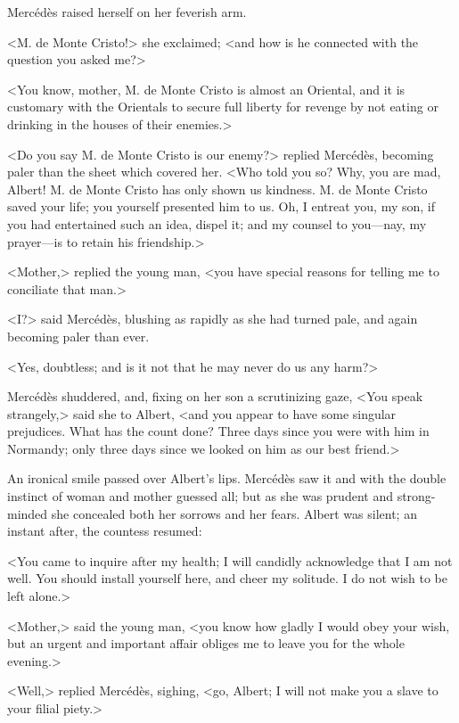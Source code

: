  Mercédès raised herself on her feverish arm. 

 <M. de Monte Cristo!> she exclaimed; <and how is he connected with the question you asked me?>

<You know, mother, M. de Monte Cristo is almost an Oriental, and it is customary with the Orientals to secure full liberty for revenge by not eating or drinking in the houses of their enemies.> 

 <Do you say M. de Monte Cristo is our enemy?> replied Mercédès, becoming paler than the sheet which covered her. <Who told you so? Why, you are mad, Albert! M. de Monte Cristo has only shown us kindness. M. de Monte Cristo saved your life; you yourself presented him to us. Oh, I entreat you, my son, if you had entertained such an idea, dispel it; and my counsel to you—nay, my prayer—is to retain his friendship.> 

 <Mother,> replied the young man, <you have special reasons for telling me to conciliate that man.> 

 <I?> said Mercédès, blushing as rapidly as she had turned pale, and again becoming paler than ever. 

 <Yes, doubtless; and is it not that he may never do us any harm?> 

 Mercédès shuddered, and, fixing on her son a scrutinizing gaze, <You speak strangely,> said she to Albert, <and you appear to have some singular prejudices. What has the count done? Three days since you were with him in Normandy; only three days since we looked on him as our best friend.> 

 An ironical smile passed over Albert's lips. Mercédès saw it and with the double instinct of woman and mother guessed all; but as she was prudent and strong-minded she concealed both her sorrows and her fears. Albert was silent; an instant after, the countess resumed: 

 <You came to inquire after my health; I will candidly acknowledge that I am not well. You should install yourself here, and cheer my solitude. I do not wish to be left alone.> 

 <Mother,> said the young man, <you know how gladly I would obey your wish, but an urgent and important affair obliges me to leave you for the whole evening.> 

 <Well,> replied Mercédès, sighing, <go, Albert; I will not make you a slave to your filial piety.> 

